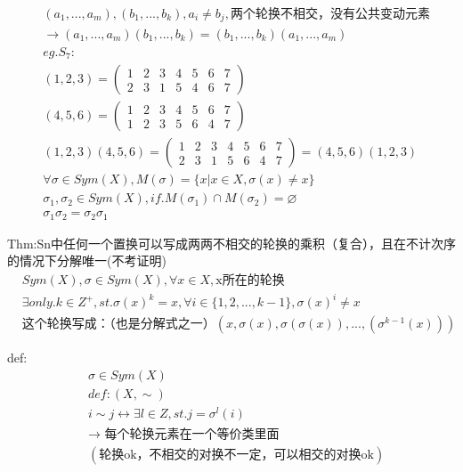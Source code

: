 \documentclass[12pt, a4paper]{article}  %
\begin{document}
\begin{align}
    &(a_1,...,a_m),(b_1,...,b_k),a_i\neq b_j,\text{两个轮换不相交，没有公共变动元素}\\
    &\rightarrow (a_1,...,a_m)(b_1,...,b_k)=(b_1,...,b_k)(a_1,...,a_m)\\
    &eg.S_7:\\
    &(1,2,3)=\begin{pmatrix}
        1&2&3&4&5&6&7\\
        2&3&1&5&4&6&7
    \end{pmatrix}\\
    &(4,5,6)=\begin{pmatrix}
        1&2&3&4&5&6&7\\
        1&2&3&5&6&4&7
    \end{pmatrix}\\
    &(1,2,3)(4,5,6)=\begin{pmatrix}
        1&2&3&4&5&6&7\\
        2&3&1&5&6&4&7
    \end{pmatrix}=(4,5,6)(1,2,3)\\
    &\forall \sigma \in Sym(X),M(\sigma)=\{x|x\in X,\sigma(x)\neq x\}\\
    &\sigma_1,\sigma_2\in Sym(X),if. M(\sigma_1)\cap M(\sigma_2)=\varnothing\\
    &\sigma_1\sigma_2=\sigma_2\sigma_1
\end{align}

Thm:Sn中任何一个置换可以写成两两不相交的轮换的乘积（复合），且在不计次序的情况下分解唯一(不考证明)\\

\begin{align}
    &Sym(X),\sigma \in Sym(X),\forall x\in X,\text{x所在的轮换}\\
    & \exists only. k\in Z^{+},st.\sigma(x)^k=x,\forall i\in\{1,2,...,k-1\},\sigma(x)^i\neq x\\
    &\text{这个轮换写成：（也是分解式之一）}(x,\sigma(x),\sigma(\sigma(x)),...,(\sigma^{k-1}(x)))
\end{align}

def:
\begin{align}
    &\sigma \in Sym(X)\\
    &def:(X,\sim)\\
    &i\sim j\leftrightarrow \exists l\in Z,st. j=\sigma^l(i)\\
    &\rightarrow  \text{ 每个轮换元素在一个等价类里面}\\
    &(\text{轮换ok，不相交的对换不一定，可以相交的对换ok})
\end{align}
\end{document}
